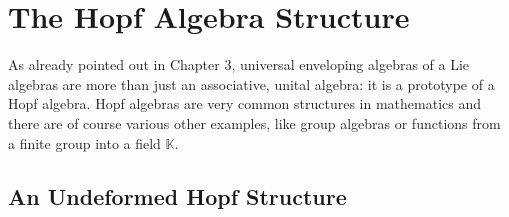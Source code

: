 
%
%

\chapter{The Hopf Algebra Structure}

As already pointed out in Chapter 3, universal enveloping algebras of a Lie 
algebras are more than just an associative, unital algebra: it is a prototype of a 
Hopf algebra. Hopf algebras are very common structures in mathematics and there 
are of course various other examples, like group algebras or functions from a 
finite group into a field $\mathbb{K}$.



\section{An Undeformed Hopf Structure}


